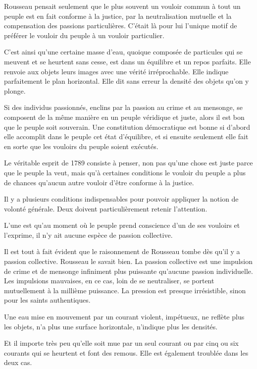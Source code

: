 \documentclass[french,twoside]{book} %
\begin{document}
Rousseau pensait seulement que le plus souvent un vouloir commun à tout un peuple est en fait conforme à la justice, par la neutralisation mutuelle et la compensation des passions particulières. C’était là pour lui l’unique motif de préférer le vouloir du peuple à un vouloir particulier.\par
C’est ainsi qu’une certaine masse d’eau, quoique composée de particules qui se meuvent et se heurtent sans cesse, est dans un équilibre et un repos parfaits. Elle renvoie aux objets leurs images avec une vérité irréprochable. Elle indique parfaitement le plan horizontal. Elle dit sans erreur la densité des objets qu’on y plonge.\par
Si des individus passionnés, enclins par la passion au crime et au mensonge, se composent de la même manière en un peuple véridique et juste, alors il est bon que le peuple soit souverain. Une constitution démocratique est bonne si d’abord elle accomplit dans le peuple cet état d’équilibre, et si ensuite seulement elle fait en sorte que les vouloirs du peuple soient exécutés.\par
Le véritable esprit de 1789 consiste à penser, non pas qu’une chose est juste parce que le peuple la veut, mais qu’à certaines conditions le vouloir du peuple a plus de chances qu’aucun autre vouloir d’être conforme à la justice.\par
Il y a plusieurs conditions indispensables pour pouvoir appliquer la notion de volonté générale. Deux doivent particulièrement retenir l’attention.\par
L’une est qu’au moment où le peuple prend conscience d’un de ses vouloirs et l’exprime, il n’y ait aucune espèce de passion collective.\par
Il est tout à fait évident que le raisonnement de Rousseau tombe dès qu’il y a passion collective. Rousseau le savait bien. La passion collective est une impulsion de crime et de mensonge infiniment plus puissante qu’aucune passion individuelle. Les impulsions mauvaises, en ce cas, loin de se neutraliser, se portent mutuellement à la millième puissance. La pression est presque irrésistible, sinon pour les saints authentiques.\par
Une eau mise en mouvement par un courant violent, impétueux, ne reflète plus les objets, n’a plus une surface horizontale, n’indique plus les densités.\par
Et il importe très peu qu’elle soit mue par un seul courant ou par cinq ou six courants qui se heurtent et font des remous. Elle est également troublée dans les deux cas.\par
\end{document}
